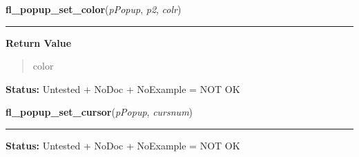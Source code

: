     \label{xformslib:library:fl_popup_set_color}

    \vspace{0.5ex}

\hspace{.8\funcindent}\begin{boxedminipage}{\funcwidth}

    \raggedright \textbf{fl\_popup\_set\_color}(\textit{pPopup}, \textit{p2}, \textit{colr})

    \vspace{-1.5ex}

    \rule{\textwidth}{0.5\fboxrule}
\setlength{\parskip}{2ex}
\setlength{\parskip}{1ex}
      \textbf{Return Value}
    \vspace{-1ex}

      \begin{quote}
      color

      \end{quote}

\textbf{Status:} Untested + NoDoc + NoExample = NOT OK



    \end{boxedminipage}

    \label{xformslib:library:fl_popup_set_cursor}

    \vspace{0.5ex}

\hspace{.8\funcindent}\begin{boxedminipage}{\funcwidth}

    \raggedright \textbf{fl\_popup\_set\_cursor}(\textit{pPopup}, \textit{cursnum})

    \vspace{-1.5ex}

    \rule{\textwidth}{0.5\fboxrule}
\setlength{\parskip}{2ex}
\setlength{\parskip}{1ex}
\textbf{Status:} Untested + NoDoc + NoExample = NOT OK



    \end{boxedminipage}

    \label{xformslib:library:fl_popup_get_title}

